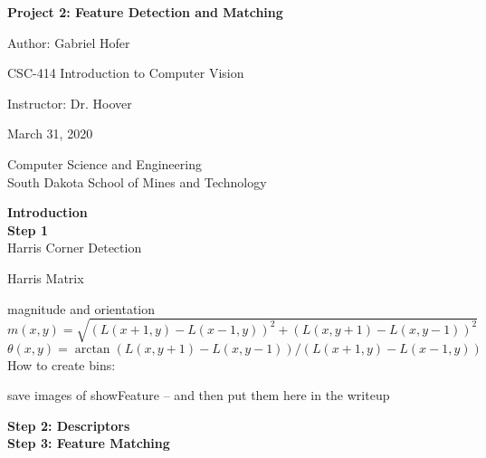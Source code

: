 \documentclass[12pt]{article}
\begin{document}
\begin{titlepage}
   \begin{center}
       \vspace*{1cm}
       \large
       \textbf{Project 2: Feature Detection and Matching}
       \normalsize

       \vspace{0.5cm}

       Author: Gabriel Hofer

       \vspace{0.5cm}

       CSC-414 Introduction to Computer Vision

       \vspace{0.5cm}

       Instructor: Dr. Hoover

       \vspace{0.5cm}

        March 31, 2020

       \vfill

       Computer Science and Engineering\\
       South Dakota School of Mines and Technology\\
   \end{center}
\end{titlepage}
\newpage


\textbf{Introduction}\\ 




\textbf{Step 1}\\ 
Harris Corner Detection



Harris Matrix



magnitude and orientation
\small
\[
    m(x,y) = \sqrt{(L(x+1,y)-L(x-1,y))^2+(L(x,y+1)-L(x,y-1))^2}
\]
\[
    \theta (x,y) = \arctan{(L(x,y+1)-L(x,y-1))/(L(x+1,y)-L(x-1,y))}
\]
How to create bins:

save images of showFeature -- and then put them here in the writeup

\textbf{Step 2: Descriptors}\\

\textbf{Step 3: Feature Matching}\\
\end{document}
